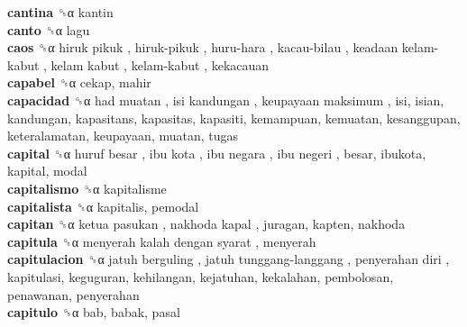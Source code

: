 \textbf{cantina} ␝α  kantin  \\
\textbf{canto} ␝α  lagu  \\
\textbf{caos} ␝α   hiruk pikuk ,  hiruk-pikuk ,  huru-hara ,  kacau-bilau ,  keadaan kelam-kabut ,  kelam kabut ,  kelam-kabut , kekacauan  \\
\textbf{capabel} ␝α  cekap, mahir  \\
\textbf{capacidad} ␝α   had muatan ,  isi kandungan ,  keupayaan maksimum , isi, isian, kandungan, kapasitans, kapasitas, kapasiti, kemampuan, kemuatan, kesanggupan, keteralamatan, keupayaan, muatan, tugas  \\
\textbf{capital} ␝α   huruf besar ,  ibu kota ,  ibu negara ,  ibu negeri , besar, ibukota, kapital, modal  \\
\textbf{capitalismo} ␝α  kapitalisme  \\
\textbf{capitalista} ␝α  kapitalis, pemodal  \\
\textbf{capitan} ␝α   ketua pasukan ,  nakhoda kapal , juragan, kapten, nakhoda  \\
\textbf{capitula} ␝α   menyerah kalah dengan syarat , menyerah  \\
\textbf{capitulacion} ␝α   jatuh berguling ,  jatuh tunggang-langgang ,  penyerahan diri , kapitulasi, keguguran, kehilangan, kejatuhan, kekalahan, pembolosan, penawanan, penyerahan  \\
\textbf{capitulo} ␝α  bab, babak, pasal  \\
